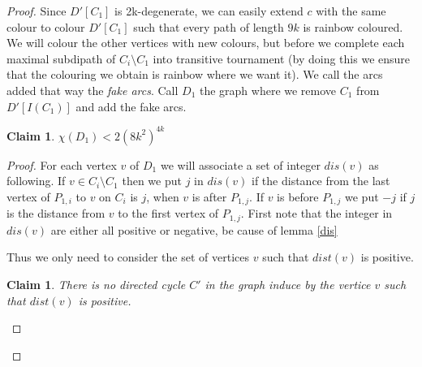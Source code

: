 \documentclass[utf8,10pt]{article}
\theoremstyle{plain}
\newtheorem{claim}[theorem]{Claim}
\theoremstyle{definition}
\theoremstyle{remark}
\begin{document}
\begin{proof}
Since $D'[C_1]$ is 2k-degenerate, we can easily extend $c$ with the same colour to colour $D'[C_1]$
such that every path of length $9k$ is rainbow coloured.
We will colour the other vertices with  new colours, but before we complete each maximal
subdipath of $C_i \setminus C_1$ into transitive tournament
(by doing this we ensure that the colouring we obtain is rainbow where we want it). We call the arcs added that way the \textit{fake arcs}.
Call $D_1$ the graph where we remove $C_1$ from $D'[I(C_1)]$ and add the fake arcs.

\begin{claim}
$\chi(D_1) <  2(8k^2)^{4k}$
\end{claim}

\begin{proof}
For each vertex $v$ of $D_1$ we will associate a set of integer $dis(v)$ as following.
If $v \in C_i \setminus C_1$ then we put $j$ in $dis(v)$ if the distance
from the last vertex of $P_{1,i}$ to $v$ on $C_i$ is $j$, when $v$ is after $P_{1,j}$.
If $v$ is before $P_{1,j}$ we put $-j$ if $j$ is the distance from $v$ to the first vertex of $P_{1,j}$.
First note that the integer in $dis(v)$ are either all positive or negative, be cause of lemma \ref{dis}

Thus we only need to consider the set of vertices $v$ such that $dist(v)$ is positive.
\begin{claim}\label{CycleDis}
There is no directed cycle $C'$ in the graph induce by the vertice $v$ such that $dist(v)$ is positive.
\end{claim}


\end{proof}
\end{proof}
\end{document}

